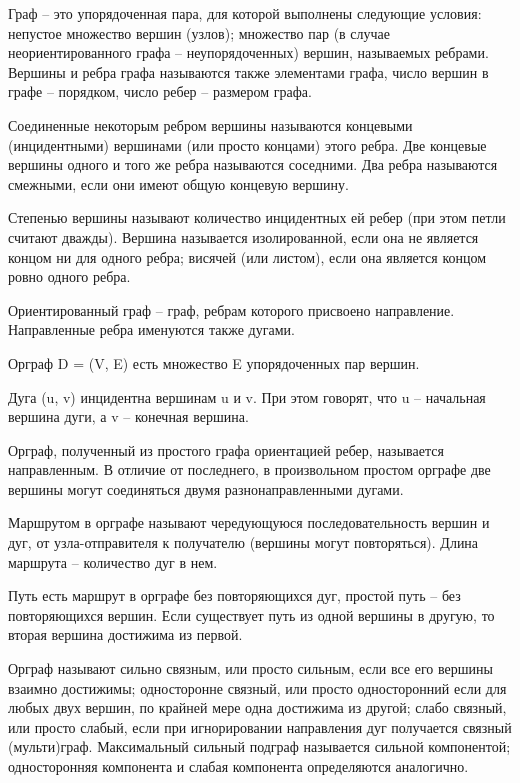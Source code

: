 \documentclass[14pt,a4paper,titlepage]{extarticle}
\begin{document}
Граф -- это упорядоченная пара, для которой выполнены следующие условия: 
непустое множество вершин (узлов); 
множество пар (в случае неориентированного графа -- неупорядоченных) вершин, называемых ребрами. Вершины и ребра графа называются также элементами графа, число вершин в графе -- порядком, число ребер -- размером графа.

Соединенные некоторым ребром вершины называются концевыми (инцидентными) вершинами (или просто концами) этого ребра. Две концевые вершины одного и того же ребра называются соседними. Два ребра называются смежными, если они имеют общую концевую вершину. 

Степенью вершины называют количество инцидентных ей ребер (при этом петли считают дважды). Вершина называется изолированной, если она не является концом ни для одного ребра; висячей (или листом), если она является концом ровно одного ребра. 

Ориентированный граф -- граф, ребрам которого присвоено направление. Направленные ребра именуются также дугами. 

Орграф D = (V, E) есть множество E упорядоченных пар вершин. 

Дуга (u, v) инцидентна вершинам u и v. При этом говорят, что u -- начальная вершина дуги, а v -- конечная вершина. 

Орграф, полученный из простого графа ориентацией ребер, называется направленным. В отличие от последнего, в произвольном простом орграфе две вершины могут соединяться двумя разнонаправленными дугами.

Маршрутом в орграфе называют чередующуюся последовательность вершин и дуг, от узла-отправителя к получателю (вершины могут повторяться). Длина маршрута -- количество дуг в нем.

Путь есть маршрут в орграфе без повторяющихся дуг, простой путь -- без повторяющихся вершин. Если существует путь из одной вершины в другую, то вторая вершина достижима из первой. 

Орграф называют сильно связным, или просто сильным, если все его вершины взаимно достижимы; односторонне связный, или просто односторонний если для любых двух вершин, по крайней мере одна достижима из другой; слабо связный, или просто слабый, если при игнорировании направления дуг получается связный (мульти)граф. Максимальный сильный подграф называется сильной компонентой; односторонняя компонента и слабая компонента определяются аналогично.
\end{document}
